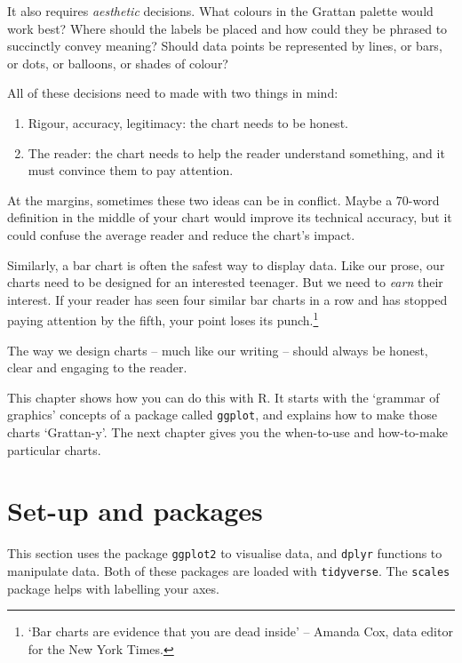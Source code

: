 \documentclass[]{book}
\providecommand{\tightlist}{%
  \setlength{\itemsep}{0pt}\setlength{\parskip}{0pt}}
\let\rmarkdownfootnote\footnote%
\def\footnote{\protect\rmarkdownfootnote}
\begin{document}
It also requires \emph{aesthetic} decisions. What colours in the Grattan palette would work best? Where should the labels be placed and how could they be phrased to succinctly convey meaning? Should data points be represented by lines, or bars, or dots, or balloons, or shades of colour?

All of these decisions need to made with two things in mind:

\begin{enumerate}
\def\labelenumi{\arabic{enumi}.}
\tightlist
\item
  Rigour, accuracy, legitimacy: the chart needs to be honest.
\item
  The reader: the chart needs to help the reader understand something, and it must convince them to pay attention.
\end{enumerate}

At the margins, sometimes these two ideas can be in conflict. Maybe a 70-word definition in the middle of your chart would improve its technical accuracy, but it could confuse the average reader and reduce the chart's impact.

Similarly, a bar chart is often the safest way to display data. Like our prose, our charts need to be designed for an interested teenager. But we need to \emph{earn} their interest. If your reader has seen four similar bar charts in a row and has stopped paying attention by the fifth, your point loses its punch.\footnote{`Bar charts are evidence that you are dead inside' -- Amanda Cox, data editor for the New York Times.}

The way we design charts -- much like our writing -- should always be honest, clear and engaging to the reader.

This chapter shows how you can do this with R. It starts with the `grammar of graphics' concepts of a package called \texttt{ggplot}, and explains how to make those charts `Grattan-y'. The next chapter gives you the when-to-use and how-to-make particular charts.

\hypertarget{set-up-and-packages}{%
\section{Set-up and packages}\label{set-up-and-packages}}

This section uses the package \texttt{ggplot2} to visualise data, and \texttt{dplyr} functions to manipulate data. Both of these packages are loaded with \texttt{tidyverse}. The \texttt{scales} package helps with labelling your axes.
\end{document}
